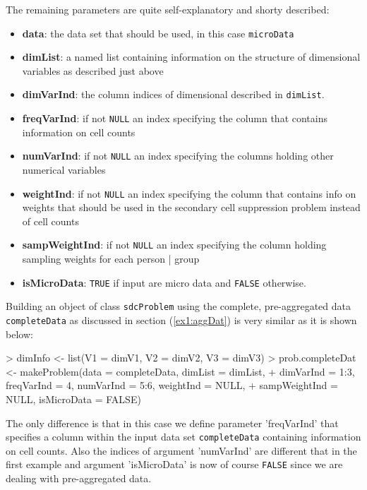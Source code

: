 \documentclass{article}
\begin{document}
The remaining parameters are quite self-explanatory and shorty described:
\begin{itemize}
	\item {\bf data}: the data set that should be used, in this case {\tt microData}
	\item {\bf dimList}: a named list containing information on the structure 
	of dimensional variables as described just above
	\item {\bf dimVarInd}: the column indices of dimensional described in {\tt dimList}.	
	\item {\bf freqVarInd}: if not {\tt NULL} an index specifying the column
	that contains information on cell counts 
	\item {\bf numVarInd}: if not {\tt NULL} an index specifying the columns
	holding other numerical variables  
	\item {\bf weightInd}: if not {\tt NULL} an index specifying the column that
	contains info on weights that should be used in the secondary cell suppression
	problem instead of cell counts
	\item {\bf sampWeightInd}: if not {\tt NULL} an index specifying the column
	holding sampling weights for each person | group  
	\item {\bf isMicroData}: {\tt TRUE} if input are micro data and {\tt FALSE} otherwise.
\end{itemize}

Building an object of class {\tt sdcProblem} using the complete, pre-aggregated 
data {\tt completeData} as discussed in section (\ref{ex1:aggDat}) is very 
similar as it is shown below:

\begin{Schunk}
\begin{Sinput}
> dimInfo <- list(V1 = dimV1, V2 = dimV2, V3 = dimV3)
> prob.completeDat <- makeProblem(data = completeData, dimList = dimList, 
+     dimVarInd = 1:3, freqVarInd = 4, numVarInd = 5:6, weightInd = NULL, 
+     sampWeightInd = NULL, isMicroData = FALSE)
\end{Sinput}
\end{Schunk}
The only difference is that in this case we define parameter 'freqVarInd' that
specifies a column within the input data set {\tt completeData} containing
information on cell counts. Also the indices of argument 'numVarInd' are different
that in the first example and argument 'isMicroData' is now of course {\tt FALSE}
since we are dealing with pre-aggregated data.\\
\end{document}
